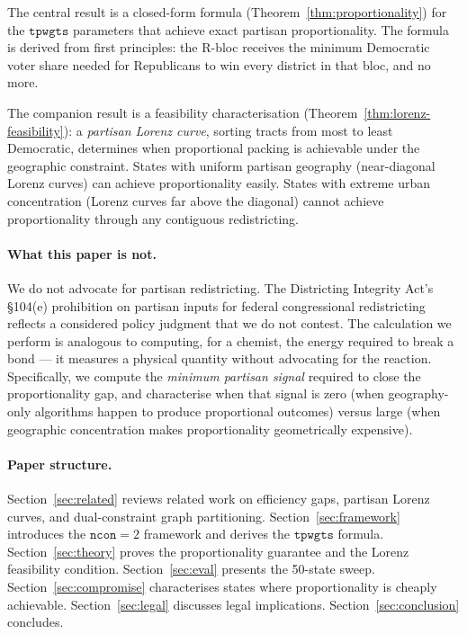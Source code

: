 The central result is a closed-form formula (Theorem~\ref{thm:proportionality})
for the $\mathtt{tpwgts}$ parameters that achieve exact partisan proportionality.
The formula is derived from first principles: the R-bloc receives the minimum
Democratic voter share needed for Republicans to win every district in that bloc,
and no more.

The companion result is a feasibility characterisation (Theorem~\ref{thm:lorenz-feasibility}):
a \emph{partisan Lorenz curve}, sorting tracts from most to least Democratic,
determines when proportional packing is achievable under the geographic
constraint.
States with uniform partisan geography (near-diagonal Lorenz curves) can
achieve proportionality easily.
States with extreme urban concentration (Lorenz curves far above the diagonal)
cannot achieve proportionality through any contiguous redistricting.

\paragraph{What this paper is not.}
We do not advocate for partisan redistricting.
The Districting Integrity Act's \S104(e) prohibition on partisan inputs for
federal congressional redistricting reflects a considered policy judgment that
we do not contest.
The calculation we perform is analogous to computing, for a chemist, the energy
required to break a bond --- it measures a physical quantity without advocating
for the reaction.
Specifically, we compute the \emph{minimum partisan signal} required to close
the proportionality gap, and characterise when that signal is zero (when
geography-only algorithms happen to produce proportional outcomes) versus
large (when geographic concentration makes proportionality geometrically expensive).

\paragraph{Paper structure.}
Section~\ref{sec:related} reviews related work on efficiency gaps, partisan
Lorenz curves, and dual-constraint graph partitioning.
Section~\ref{sec:framework} introduces the $\mathtt{ncon}=2$ framework and
derives the $\mathtt{tpwgts}$ formula.
Section~\ref{sec:theory} proves the proportionality guarantee and the
Lorenz feasibility condition.
Section~\ref{sec:eval} presents the 50-state sweep.
Section~\ref{sec:compromise} characterises states where proportionality is
cheaply achievable.
Section~\ref{sec:legal} discusses legal implications.
Section~\ref{sec:conclusion} concludes.

